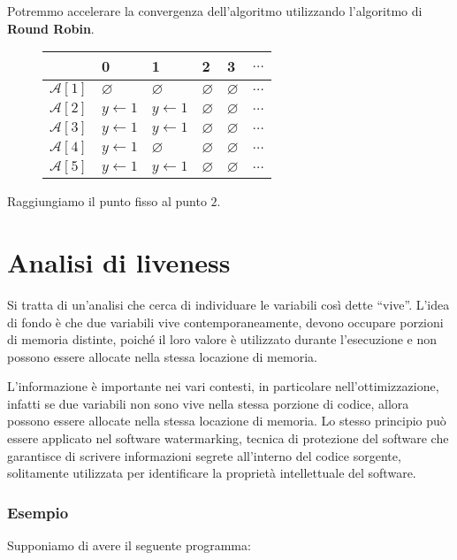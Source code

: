 Potremmo accelerare la convergenza dell'algoritmo utilizzando l'algoritmo di \textbf{Round Robin}.
\begin{figure}[H]
    \centering
    \renewcommand{\arraystretch}{2}
    \begin{tabular}{|>{\centering\arraybackslash}m{5em}|m{5em}|m{5em}|m{5em}|m{5em}|m{5em}|}
        \hline
        & \textbf{0} & \textbf{1} & \textbf{2} & \textbf{3} & \textbf{$\dots$} \\
        \hline
        $\mathcal{A}[1]$ & $\varnothing$ & $\varnothing$ & $\varnothing$ & $\varnothing$ & $\dots$ \\
        \hline
        $\mathcal{A}[2]$ & $y \gets 1$ & $y \gets 1$ & $\varnothing$ 
        & $\varnothing$ & $\dots$ \\
        \hline
        $\mathcal{A}[3]$ & $y \gets 1$ & $y \gets 1$ & $\varnothing$ & $\varnothing$ & $\dots$ \\
        \hline
        $\mathcal{A}[4]$ & $y \gets 1$ &$\varnothing$ & $\varnothing$ & $\varnothing$ & $\dots$ \\
        \hline
        $\mathcal{A}[5]$ & $y \gets 1$ &$y \gets 1$ & $\varnothing$ & $\varnothing$ & $\dots$ \\
        \hline
    \end{tabular}
\end{figure}
Raggiungiamo il punto fisso al punto $2$.
\section{Analisi di liveness}
Si tratta di un'analisi che cerca di individuare le variabili così dette ``vive''. 
L'idea di fondo è che due variabili vive contemporaneamente, devono occupare 
porzioni di memoria distinte, poiché il loro valore è utilizzato durante l'esecuzione 
e non possono essere allocate nella stessa locazione di memoria.

L'informazione è importante nei vari contesti, in particolare nell'ottimizzazione,
infatti se due variabili non sono vive nella stessa porzione di codice, allora
possono essere allocate nella stessa locazione di memoria. Lo stesso principio 
può essere applicato nel software watermarking, tecnica di protezione del software
che garantisce di scrivere informazioni segrete all'interno del codice sorgente,
solitamente utilizzata per identificare la proprietà intellettuale del software.

\subsubsection{Esempio}
Supponiamo di avere il seguente programma:


